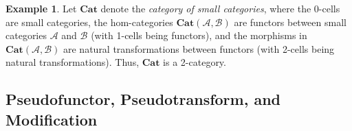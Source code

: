 \documentclass[openany, amssymb, psamsfonts]{amsart}
\theoremstyle{definition}
\newtheorem{exmp}{Example}[section]
\numberwithin{equation}{section}
\newcommand{\Cat}{\mathbf{Cat}} %
\newcommand{\A}{\mathscr{A}}
\newcommand{\B}{\mathscr{B}}
\newcommand{\C}{\mathscr{C}}
\begin{document}
\begin{exmp}\label{exmp_cat_of_cat}
    Let $\Cat$ denote the \emph{category of small categories}, where the 0-cells are small categories, the hom-categories $\Cat(\A,\B)$ are functors between small categories $\A$ and $\B$ (with 1-cells being functors), and the morphisms in $\Cat(\A,\B)$ are natural transformations between functors (with 2-cells being natural transformations). Thus, $\Cat$ is a 2-category.
    
\end{exmp}

\vspace{1pt}

\subsection{Pseudofunctor, Pseudotransform, and Modification}\label{sub_pseudos}
\end{document}

